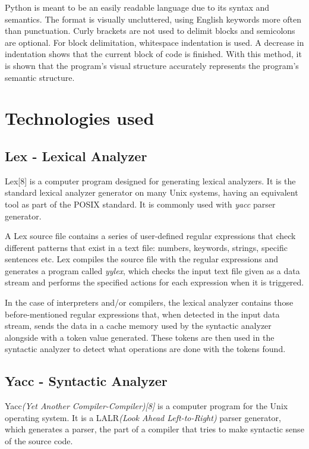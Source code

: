 \documentclass[12pt,a4paper,twoside]{report}
\begin{document}
Python is meant to be an easily readable language due to its syntax and semantics. The format is visually uncluttered, using English keywords more often than punctuation. Curly brackets are not used to delimit blocks and semicolons are optional. For block delimitation, whitespace indentation is used. A decrease in indentation shows that the current block of code is finished. With this method, it is shown that the program's visual structure accurately represents the program's semantic structure. 

\section{Technologies used}

\subsection{Lex - Lexical Analyzer}

Lex[8] is a computer program designed for generating lexical analyzers. It is the standard lexical analyzer generator on many Unix systems, having an equivalent tool as part of the POSIX standard. It is commonly used with \textit{yacc} parser generator. 

A Lex source file contains a series of user-defined regular expressions that check different patterns that exist in a text file: numbers, keywords, strings, specific sentences etc. Lex compiles the source file with the regular expressions and generates a program called \textit{yylex}, which checks the input text file given as a data stream and performs the specified actions for each expression when it is triggered. 

In the case of interpreters and/or compilers, the lexical analyzer contains those before-mentioned regular expressions that, when detected in the input data stream, sends the data in a cache memory used by the syntactic analyzer alongside with a token value generated. These tokens are then used in the syntactic analyzer to detect what operations are done with the tokens found.
\subsection{Yacc - Syntactic Analyzer}

Yacc\textit{(Yet Another Compiler-Compiler)[8]} is a computer program for the Unix operating system. It is a LALR\textit{(Look Ahead Left-to-Right)} parser generator, which generates a parser, the part of a compiler that tries to make syntactic sense of the source code.
\end{document}
